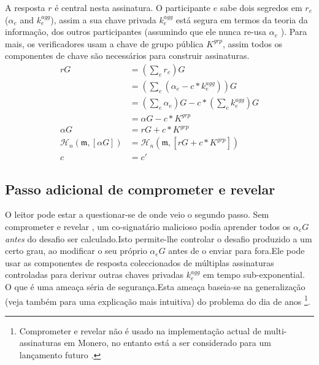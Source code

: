 A resposta $r$ é central nesta assinatura. O participante $e$ sabe dois segredos em $r_e$ ($\alpha_e$ and $k^{agg}_e$), assim a sua chave privada $k^{agg}_e$ está segura em termos da teoria da informação, dos outros participantes (assumindo que ele nunca re-usa $\alpha_e$ ). Para mais, os verificadores usam a chave de grupo pública $K^{grp}$, assim todos os componentes de chave são necessários para construir assinaturas.
\begin{align*}
    r G &= (\sum_e r_e) G \\
      &= (\sum_e (\alpha_e - c*k^{agg}_e)) G \\
      &= (\sum_e \alpha_e) G - c*(\sum_e k^{agg}_e) G \\
      &= \alpha G - c*K^{grp} \\
    \alpha G &= r G + c*K^{grp} \\
    \mathcal{H}_n(\mathfrak{m},[\alpha G]) &= \mathcal{H}_n(\mathfrak{m},[r G + c*K^{grp}]) \\
    c &= c'
\end{align*}


\subsection*{Passo adicional de comprometer e revelar}

O leitor pode estar a questionar-se de onde veio o segundo passo. Sem comprometer e revelar \cite{MRL-0009-multisig}, um co-signatário malicioso podia aprender todos os $\alpha_e G$ {\em antes} do desafio ser calculado.\newline Isto permite-lhe controlar o desafio produzido a um certo grau, ao modificar o seu próprio $\alpha_e G$ antes de o enviar para fora.\newline Ele pode usar as componentes de resposta coleccionados de múltiplas assinaturas controladas para derivar outras chaves privadas $k^{agg}_e$ em tempo sub-exponential\cite{cryptoeprint:2018:417}. O que é uma ameaça séria de segurança.\newline Esta ameaça baseia-se na generalização \cite{generalized-birthday-wagner} (veja também \cite{adam-wagnerian-tragedies} para uma explicação mais intuitiva) do problema do dia de anos \cite{birthday-problem} \footnote{Comprometer e revelar não é usado na implementação actual de multi-assinaturas em Monero, no entanto está a ser considerado para um lançamento futuro \cite{multisig-research-issue-67}.}.  

